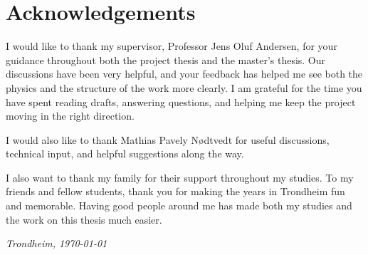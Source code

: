 \chapter*{Acknowledgements}

I would like to thank my supervisor, Professor Jens Oluf Andersen, for your
guidance throughout both the project thesis and the master's thesis. Our
discussions have been very helpful, and your feedback has helped me see
both the physics and the structure of the work more clearly. I am grateful for
the time you have spent reading drafts, answering questions, and helping me keep
the project moving in the right direction.

I would also like to thank Mathias Pavely Nødtvedt for useful discussions,
technical input, and helpful suggestions along the way.

I also want to thank my family for their support throughout my studies. To my
friends and fellow students, thank you for making the years in Trondheim fun and
memorable. Having good people around me has made both my studies and the work on
this thesis much easier.

\vfill
\begin{flushright}
\textit{Trondheim, \today}
\end{flushright}